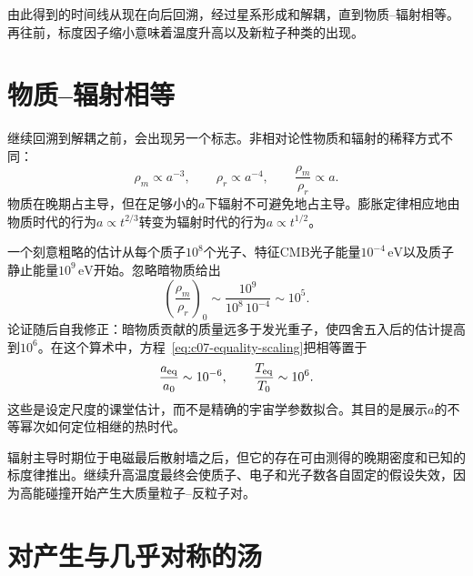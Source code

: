 由此得到的时间线从现在向后回溯，经过星系形成和解耦，直到物质--辐射相等。再往前，标度因子缩小意味着温度升高以及新粒子种类的出现。

\section{物质--辐射相等}

继续回溯到解耦之前，会出现另一个标志。非相对论性物质和辐射的稀释方式不同：
\begin{equation}
\rho_m\propto a^{-3},
\qquad
\rho_r\propto a^{-4},
\qquad
\frac{\rho_m}{\rho_r}\propto a.
\label{eq:c07-equality-scaling}
\end{equation}
物质在晚期占主导，但在足够小的\(a\)下辐射不可避免地占主导。膨胀定律相应地由物质时代的行为\(a\propto t^{2/3}\)转变为辐射时代的行为\(a\propto t^{1/2}\)。

一个刻意粗略的估计从每个质子\(10^8\)个光子、特征CMB光子能量\(10^{-4}\,\mathrm{eV}\)以及质子静止能量\(10^9\,\mathrm{eV}\)开始。忽略暗物质给出
\begin{equation}
\left(\frac{\rho_m}{\rho_r}\right)_0
\sim
\frac{10^9}{10^8\,10^{-4}}
\sim10^5.
\end{equation}
论证随后自我修正：暗物质贡献的质量远多于发光重子，使四舍五入后的估计提高到\(10^6\)。在这个算术中，方程~\eqref{eq:c07-equality-scaling}把相等置于
\begin{equation}
\frac{a_{\rm eq}}{a_0}\sim10^{-6},
\qquad
\frac{T_{\rm eq}}{T_0}\sim10^6.
\label{eq:c07-equality-estimate}
\end{equation}
这些是设定尺度的课堂估计，而不是精确的宇宙学参数拟合。其目的是展示\(a\)的不等幂次如何定位相继的热时代。

辐射主导时期位于电磁最后散射墙之后，但它的存在可由测得的晚期密度和已知的标度律推出。继续升高温度最终会使质子、电子和光子数各自固定的假设失效，因为高能碰撞开始产生大质量粒子--反粒子对。

\begin{classroomqa}
\end{classroomqa}

\section{对产生与几乎对称的汤}

